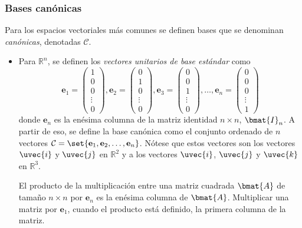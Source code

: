 \documentclass{fmbnotes}
\begin{document}
\subsubsection{Bases canónicas}
Para los espacios vectoriales más comunes se definen bases que se denominan \emph{canónicas}, denotadas \(\mathcal{C}\).

\begin{itemize}
\item Para \(\mathbb{R}^{n}\), se definen los \emph{vectores unitarios de base estándar} como
\[\mathbf{e}_1=\begin{pmatrix}
1 \\ 0 \\ 0 \\ \vdots \\ 0
\end{pmatrix}, \mathbf{e}_2=\begin{pmatrix}
0 \\ 1 \\ 0 \\ \vdots \\ 0
\end{pmatrix}, \mathbf{e}_3=\begin{pmatrix}
0 \\ 0 \\ 1 \\ \vdots \\ 0
\end{pmatrix},\ldots, \mathbf{e}_n=\begin{pmatrix}
0 \\ 0 \\ 0 \\ \vdots \\ 1
\end{pmatrix}\]
donde \(\mathbf{e}_n\) es la enésima columna de la matriz identidad \(n \times n\), \(\bmat{I}_n\). A partir de eso, se define la base canónica como el conjunto ordenado de \(n\) vectores \(\mathcal{C}=\set{\mathbf{e}_1, \mathbf{e}_2, \ldots,\mathbf{e}_n}\). Nótese que estos vectores son los vectores \(\uvec{i}\) y \(\uvec{j}\) en \(\mathbb{R}^{2}\) y a los vectores \(\uvec{i}\), \(\uvec{j}\) y \(\uvec{k}\) en \(\mathbb{R}^{3}\). 

\begin{tip}
	 El producto de la multiplicación entre una matriz cuadrada \(\bmat{A}\) de tamaño \(n \times n\) por \(\mathbf{e}_n\) es la enésima columna de \(\bmat{A}\). Multiplicar una matriz por \(\mathbf{e}_1\), cuando el producto está definido,  la primera columna de la matriz.
\end{tip}


\end{itemize}
\end{document}
